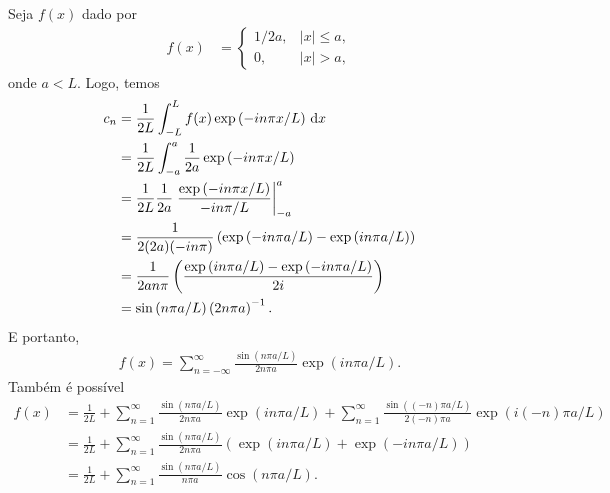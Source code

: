 \begin{exem}
    Seja $f(x)$ dado por
    \begin{align*}
        f(x) &= \begin{cases}
            1 / 2a, & |x| \leq a, \\
            0, & |x| > a,
        \end{cases}
    \end{align*}
    onde $a < L$. Logo, temos
    \begin{align*}
        c_n &= \frac{1}{2L} \int_{-L}^L f(x) \exp\left( -i n \pi x / L \right) \, \mathrm{d}x \\
        &= \frac{1}{2L} \int_{-a}^a \frac{1}{2a} \exp\left( -i n \pi x / L \right) \\
        &= \frac{1}{2L} \frac{1}{2a} \left. \frac{\exp\left( -i n \pi x / L \right)}{- i n \pi / L} \right|_{-a}^a \\
        &= \frac{1}{2 (2a) (-i n \pi)} \left( \exp\left( -i n \pi a / L \right) - \exp\left( i n \pi a / L \right) \right) \\
        &= \frac{1}{2 a n \pi} \left( \frac{\exp\left( i n \pi a / L \right) - \exp\left( -i n \pi a / L \right)}{2 i} \right) \\
        &= \sin\left( n \pi a / L \right) \left( 2 n \pi a \right)^{-1}.
    \end{align*}
    E portanto,
    \begin{align*}
        f(x) = \sum_{n = -\infty}^\infty \frac{\sin\left( n \pi a / L \right)}{2 n \pi a} \exp\left( i n \pi a / L \right).
    \end{align*}
    Tamb\'{e}m \'{e} poss\'{i}vel
    \begin{align*}
        f(x) &= \frac{1}{2 L} + \sum_{n = 1}^\infty \frac{\sin\left( n \pi a / L \right)}{2 n \pi a} \exp\left( i n \pi a / L \right) + \sum_{n = 1}^\infty \frac{\sin\left( (-n) \pi a / L \right)}{2 (-n) \pi a} \exp\left( i (-n) \pi a / L \right) \\
        &= \frac{1}{2L} + \sum_{n = 1}^\infty \frac{\sin\left( n \pi a / L \right)}{2 n \pi a} \left( \exp\left( i n \pi a / L \right) + \exp\left( -i n \pi a / L \right) \right) \\
        &= \frac{1}{2L} + \sum_{n = 1}^\infty \frac{\sin\left( n \pi a / L \right)}{n \pi a} \cos\left( n \pi a / L \right).
    \end{align*}
\end{exem}

